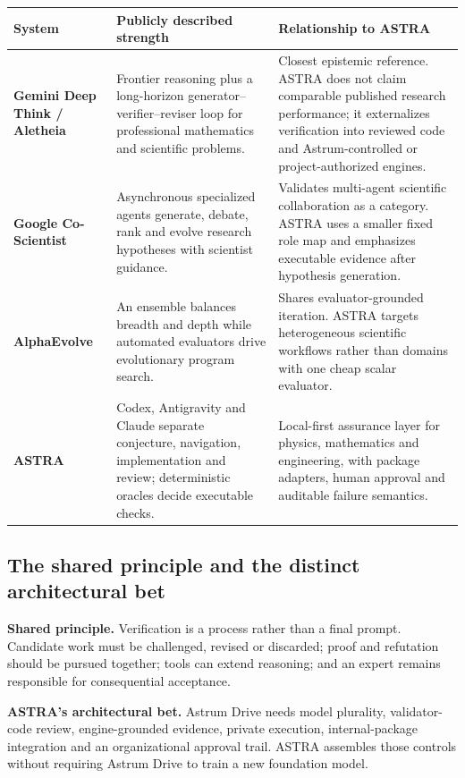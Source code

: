 \documentclass[10pt,a4paper]{article}
\begin{document}
\begin{tabularx}{\textwidth}{@{}>{\bfseries\color{navy}}p{2.7cm} p{4.2cm} Y@{}}
\toprule
System & Publicly described strength & Relationship to ASTRA \\
\midrule
Gemini Deep Think / Aletheia &
Frontier reasoning plus a long-horizon generator--verifier--reviser loop for
professional mathematics and scientific problems. &
Closest epistemic reference. ASTRA does not claim comparable published research
performance; it externalizes verification into reviewed code and
Astrum-controlled or project-authorized engines. \\
\addlinespace
Google Co-Scientist &
Asynchronous specialized agents generate, debate, rank and evolve research
hypotheses with scientist guidance. &
Validates multi-agent scientific collaboration as a category. ASTRA uses a smaller
fixed role map and emphasizes executable evidence after hypothesis generation. \\
\addlinespace
AlphaEvolve &
An ensemble balances breadth and depth while automated evaluators drive evolutionary
program search. &
Shares evaluator-grounded iteration. ASTRA targets heterogeneous scientific workflows
rather than domains with one cheap scalar evaluator. \\
\addlinespace
ASTRA &
Codex, Antigravity and Claude separate conjecture, navigation, implementation and
review; deterministic oracles decide executable checks. &
Local-first assurance layer for physics, mathematics and engineering, with package
adapters, human approval and auditable failure semantics. \\
\bottomrule
\end{tabularx}

\subsection*{The shared principle and the distinct architectural bet}

\begin{multicols}{2}
\textbf{\color{navy}Shared principle.}
Verification is a process rather than a final prompt. Candidate work must be challenged,
revised or discarded; proof and refutation should be pursued together; tools can extend
reasoning; and an expert remains responsible for consequential acceptance.

\columnbreak
\textbf{\color{navy}ASTRA's architectural bet.}
Astrum Drive needs model plurality, validator-code review, engine-grounded evidence,
private execution, internal-package integration and an organizational approval trail.
ASTRA assembles those controls without requiring Astrum Drive to train a new
foundation model.
\end{multicols}
\end{document}
